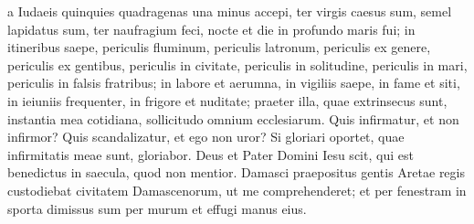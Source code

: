 \begin{biblechapter}
\begin{biblechapter}
\begin{biblechapter}
\begin{biblechapter}
\begin{biblechapter}
\begin{biblechapter}
\begin{biblechapter}
\begin{biblechapter}
\begin{biblechapter}
\begin{biblechapter}
\begin{biblechapter}
\verse a Iudaeis quinquies quadragenas una minus accepi, 
\verse ter virgis caesus sum, semel lapidatus sum, ter naufragium feci, nocte et die in profundo maris fui; 
\verse in itineribus saepe, periculis fluminum, periculis latronum, periculis ex genere, periculis ex gentibus, periculis in civitate, periculis in solitudine, periculis in mari, periculis in falsis fratribus; 
\verse in labore et aerumna, in vigiliis saepe, in fame et siti, in ieiuniis frequenter, in frigore et nuditate; 
\verse praeter illa, quae extrinsecus sunt, instantia mea cotidiana, sollicitudo omnium ecclesiarum. 
 \verse Quis infirmatur, et non infirmor? Quis scandalizatur, et ego non uror?
 \verse Si gloriari oportet, quae infirmitatis meae sunt, gloriabor. 
\verse Deus et Pater Domini Iesu scit, qui est benedictus in saecula, quod non mentior. 
\verse Damasci praepositus gentis Aretae regis custodiebat civitatem Damascenorum, ut me comprehenderet; 
\verse et per fenestram in sporta dimissus sum per murum et effugi manus eius.
 

\end{biblechapter}
\end{biblechapter}
\end{biblechapter}
\end{biblechapter}
\end{biblechapter}
\end{biblechapter}
\end{biblechapter}
\end{biblechapter}
\end{biblechapter}
\end{biblechapter}
\end{biblechapter}
